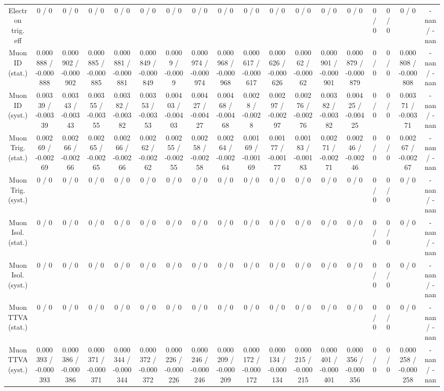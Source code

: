 \documentclass[10pt]{article}
\begin{document}
\begin{table}[htbp]
\begin{center}
\begin{tabular}{|c|c|c|c|c|c|c|c|c|c|c|c|c|c|c|c|c|c|}
  Electron trig. eff & 0 / 0 & 0 / 0 & 0 / 0 & 0 / 0 & 0 / 0 & 0 / 0 & 0 / 0 & 0 / 0 & 0 / 0 & 0 / 0 & 0 / 0 & 0 / 0 & 0 / 0 & 0 / 0 & 0 / 0 & 0 / 0 & -nan / -nan \\ 
  Muon ID (stat.) & 0.000888 / -0.000888 & 0.000902 / -0.000902 & 0.000885 / -0.000885 & 0.000881 / -0.000881 & 0.000849 / -0.000849 & 0.0009 / -0.0009 & 0.000974 / -0.000974 & 0.000968 / -0.000968 & 0.000617 / -0.000617 & 0.000626 / -0.000626 & 0.00062 / -0.00062 & 0.000901 / -0.000901 & 0.000879 / -0.000879 & 0 / 0 & 0 / 0 & 0.000808 / -0.000808 & -nan / -nan \\ 
  Muon ID (syst.) & 0.00339 / -0.00339 & 0.00343 / -0.00343 & 0.00355 / -0.00355 & 0.00382 / -0.00382 & 0.00353 / -0.00353 & 0.00403 / -0.00403 & 0.00427 / -0.00427 & 0.00468 / -0.00468 & 0.0028 / -0.0028 & 0.00297 / -0.00297 & 0.00276 / -0.00276 & 0.00382 / -0.00382 & 0.00425 / -0.00425 & 0 / 0 & 0 / 0 & 0.00371 / -0.00371 & -nan / -nan \\ 
  Muon Trig. (stat.) & 0.00269 / -0.00269 & 0.00266 / -0.00266 & 0.00265 / -0.00265 & 0.00266 / -0.00266 & 0.00262 / -0.00262 & 0.00255 / -0.00255 & 0.00258 / -0.00258 & 0.00264 / -0.00264 & 0.00169 / -0.00169 & 0.00177 / -0.00177 & 0.00183 / -0.00183 & 0.00271 / -0.00271 & 0.00246 / -0.00246 & 0 / 0 & 0 / 0 & 0.00267 / -0.00267 & -nan / -nan \\ 
  Muon Trig. (syst.) & 0 / 0 & 0 / 0 & 0 / 0 & 0 / 0 & 0 / 0 & 0 / 0 & 0 / 0 & 0 / 0 & 0 / 0 & 0 / 0 & 0 / 0 & 0 / 0 & 0 / 0 & 0 / 0 & 0 / 0 & 0 / 0 & -nan / -nan \\ 
  Muon Isol. (stat.) & 0 / 0 & 0 / 0 & 0 / 0 & 0 / 0 & 0 / 0 & 0 / 0 & 0 / 0 & 0 / 0 & 0 / 0 & 0 / 0 & 0 / 0 & 0 / 0 & 0 / 0 & 0 / 0 & 0 / 0 & 0 / 0 & -nan / -nan \\ 
  Muon Isol. (syst.) & 0 / 0 & 0 / 0 & 0 / 0 & 0 / 0 & 0 / 0 & 0 / 0 & 0 / 0 & 0 / 0 & 0 / 0 & 0 / 0 & 0 / 0 & 0 / 0 & 0 / 0 & 0 / 0 & 0 / 0 & 0 / 0 & -nan / -nan \\ 
  Muon TTVA (stat.) & 0 / 0 & 0 / 0 & 0 / 0 & 0 / 0 & 0 / 0 & 0 / 0 & 0 / 0 & 0 / 0 & 0 / 0 & 0 / 0 & 0 / 0 & 0 / 0 & 0 / 0 & 0 / 0 & 0 / 0 & 0 / 0 & -nan / -nan \\ 
  Muon TTVA (syst.) & 0.000393 / -0.000393 & 0.000386 / -0.000386 & 0.000371 / -0.000371 & 0.000344 / -0.000344 & 0.000372 / -0.000372 & 0.000226 / -0.000226 & 0.000246 / -0.000246 & 0.000209 / -0.000209 & 0.000172 / -0.000172 & 0.000134 / -0.000134 & 0.000215 / -0.000215 & 0.000401 / -0.000401 & 0.000356 / -0.000356 & 0 / 0 & 0 / 0 & 0.000258 / -0.000258 & -nan / -nan \\ 

\end{tabular}
\end{center}
\end{table}
\end{document}
